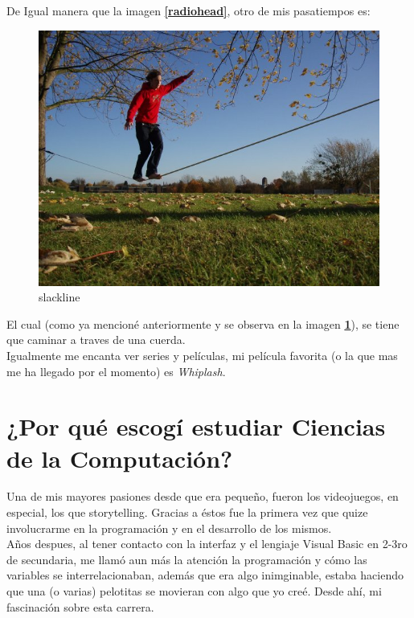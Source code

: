 \clearpage

De Igual manera que la imagen \textbf{\ref{radiohead}}, otro de mis pasatiempos es:

\begin{figure}[H]
  \centering
  \includegraphics[scale=0.1]{Julian/slackline .jpg}
  \caption{slackline}
  \label{slack}
\end{figure}

El cual (como ya mencioné anteriormente y se observa en la imagen \textbf{\ref{slack}}), se tiene que caminar a traves de una cuerda.
\\

Igualmente me encanta ver series y películas, mi película favorita (o la que mas me ha llegado por el momento) es \textit{Whiplash}.

\section{¿Por qué escogí estudiar Ciencias de la Computación?}

Una de mis mayores pasiones desde que era pequeño, fueron los videojuegos, en especial, los que storytelling. Gracias a éstos fue la primera vez
que quize involucrarme en la programación y en el desarrollo de los mismos.
\\

Años despues, al tener contacto con la interfaz y el lengiaje Visual Basic en 2-3ro de secundaria, me llamó aun más la atención la programación y
cómo las variables se interrelacionaban, además que era algo inimginable, estaba haciendo que una (o varias) pelotitas se movieran con algo que yo creé. Desde ahí,
mi fascinación sobre esta carrera.
\\

